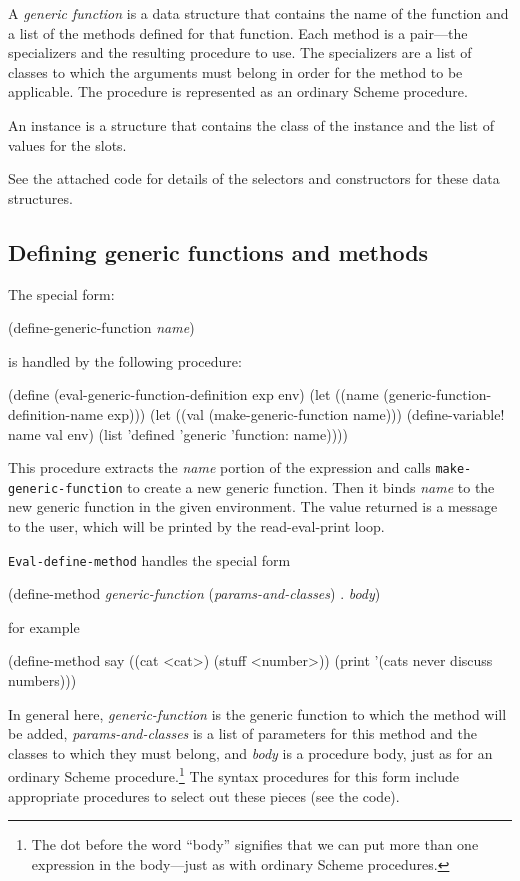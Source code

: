 A {\it generic function} is a data structure that contains the name of
the function and a list of the methods defined for that function.
Each method is a pair---the specializers and the resulting procedure
to use.  The specializers are a list of classes to which the arguments
must belong in order for the method to be applicable.  The procedure
is represented as an ordinary Scheme procedure.

An instance is a structure that contains the class of the instance and
the list of values for the slots.

See the attached code for details of the selectors and constructors
for these data structures.

\subsection{Defining generic functions and methods}

The special form:

\beginlisp
(define-generic-function {\it name})
\endlisp

\noindent
is handled by the following procedure:

\beginlisp
(define (eval-generic-function-definition exp env)
  (let ((name (generic-function-definition-name exp)))
    (let ((val (make-generic-function name)))
      (define-variable! name val env)
      (list 'defined 'generic 'function: name))))
\endlisp

This procedure extracts the {\it name} portion of the expression and
calls {\tt make-generic-function} to create a new generic function.
Then it binds {\it name} to the new generic function in the given
environment.  The value returned is a message to the user, which will
be printed by the read-eval-print loop.

{\tt Eval-define-method} handles the special form

\beginlisp
(define-method {\it generic-function} ({\it params-and-classes}) . {\it body})
\endlisp

for example

\beginlisp
(define-method say ((cat <cat>) (stuff <number>))
          (print '(cats never discuss numbers)))
\endlisp

In general here, {\it generic-function} is the generic function to
which the method will be added, {\it params-and-classes} is a list of
parameters for this method and the classes to which they must belong,
and {\it body} is a procedure body, just as for an ordinary Scheme
procedure.\footnote{The dot before the word ``body'' signifies that we
can put more than one expression in the body---just as with ordinary
Scheme procedures.} The syntax procedures for this form include
appropriate procedures to select out these pieces (see the code).


